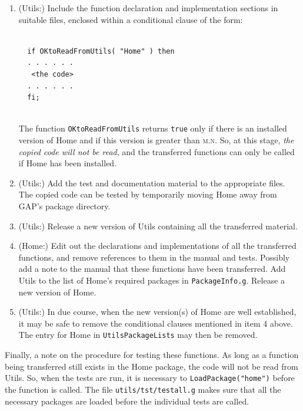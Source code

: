 \documentclass[a4paper,11pt]{report}
\begin{document}
{\begin{enumerate}
\begin{Verbatim}[commandchars=!@|,fontsize=\small,frame=single,label=Example]
  UtilsPackageVersions := 
    [ "autodoc",     "2016.01.31", 
      "resclasses",  "4.2.5", 
      "home",        "m.n",
      ...,           ... 
    ];
  
\end{Verbatim}
 While the transfers are being made, it is essential that any new versions of \textsf{Home} should be tested with the latest version of \textsf{Utils} before they are released, so as to avoid loading failures. 
\item  (\textsf{Utils}:) Include the function declaration and implementation sections in suitable
files, enclosed within a conditional clause of the form: 
\begin{Verbatim}[commandchars=!@|,fontsize=\small,frame=single,label=Example]
  
  if OKtoReadFromUtils( "Home" ) then
  . . . . . . 
   <the code> 
  . . . . . . 
  fi;
  
\end{Verbatim}
  The function \texttt{OKtoReadFromUtils} returns \texttt{true} only if there is an installed version of \textsf{Home} and if this version is greater than \textsc{m.n}. So, at this stage, \emph{the copied code will not be read}, and the transferred functions can only be called if \textsf{Home} has been installed. 
\item  (\textsf{Utils}:) Add the test and documentation material to the appropriate files. The
copied code can be tested by temporarily moving \textsf{Home} away from \textsf{GAP}'s package directory. 
\item  (\textsf{Utils}:) Release a new version of \textsf{Utils} containing all the transferred material. 
\item  (\textsf{Home}:) Edit out the declarations and implementations of all the transferred
functions, and remove references to them in the manual and tests. Possibly add
a note to the manual that these functions have been transferred. Add \textsf{Utils} to the list of \textsf{Home}'s required packages in \texttt{PackageInfo.g}. Release a new version of \textsf{Home}. 
\item  (\textsf{Utils}:) In due course, when the new version(s) of \textsf{Home} are well established, it may be safe to remove the conditional clauses
mentioned in item 4 above. The entry for \textsf{Home} in \texttt{UtilsPackageLists} may then be removed. 
\end{enumerate}
 

 Finally, a note on the procedure for testing these functions. As long as a
function being transferred still exists in the \textsf{Home} package, the code will not be read from \textsf{Utils}. So, when the tests are run, it is necessary to \texttt{LoadPackage("home")} before the function is called. The file \texttt{utils/tst/testall.g} makes sure that all the necessary packages are loaded before the individual
tests are called. }
\end{document}
